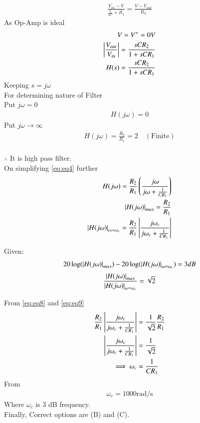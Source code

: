 \documentclass[journal,12pt,twocolumn]{IEEEtran}
\theoremstyle{remark}
\begin{document}
\begin{align}
\frac{V_{in}-V}{\frac{1}{sC}+R_1}=\frac{V-V_{out}}{R_2}
\end{align}
As Op-Amp is ideal
\begin{align}
V=V^+=0V\\
\left\vert\frac{V_{out}}{V_{in}}\right\vert=\frac{sCR_2}{1+sCR_1}\\
H(s)=\frac{sCR_2}{1+sCR_1}
\label{eq:eq4}
\end{align}
Keeping $s=j\omega$\\
For determining nature of Filter\\
Put $j\omega=0$
\begin{align}
H(j\omega)=0
\end{align}
Put $j\omega\rightarrow \infty$
\begin{align}
H(j\omega)=\frac{R_2}{R_1}=2\quad (\text{Finite})
\end{align}\\
$\therefore$ It is high pass filter.\\

On simplifying \eqref{eq:eq4} further
\begin{align}
H(j\omega)=\frac{R_2}{R_1}\left(\frac{j\omega}{j\omega+\frac{1}{CR_1}}\right)\\
\left\vert H(j\omega)\right\vert_{max}=\frac{R_2}{R_1} \label{eq:eq8}\\
\left\vert H(j\omega)\right\vert_{\omega=\omega_c}=\frac{R_2}{R_1}\left\vert\frac{j\omega_c}{j\omega_c+\frac{1}{CR_1}}\right\vert
\label{eq:eq9}
\end{align}

Given: 
\begin{align}
20\log(\left\vert H(j\omega)\right\vert_{max})-20\log(\left\vert H(j\omega)\right\vert_{\omega=\omega_c})=3 dB
\end{align}
\begin{align}
\frac{\left\vert H(j\omega)\right\vert_{max}}{\left\vert H(j\omega)\right\vert_{\omega=\omega_c}}=\sqrt 2
\end{align}
 
From \eqref{eq:eq8} and \eqref{eq:eq9}
\begin{align}
\frac{R_2}{R_1}\left\vert\frac{j\omega_c}{j\omega_c+\frac{1}{CR_1}}\right\vert&=\frac{1}{\sqrt 2}\frac{R_2}{R_1}\\
\left\vert\frac{j\omega_c}{j\omega_c+\frac{1}{CR_1}}\right\vert&=\frac{1}{\sqrt 2}\\
\implies \omega_c &= \frac{1}{CR_1}
\end{align}
From 
\begin{align}
\omega_c= 1000 \text{rad/s}
\end{align}
Where $\omega_c$ is 3 dB frequency.\\

Finally, Correct options are (B) and (C).
\end{document}
